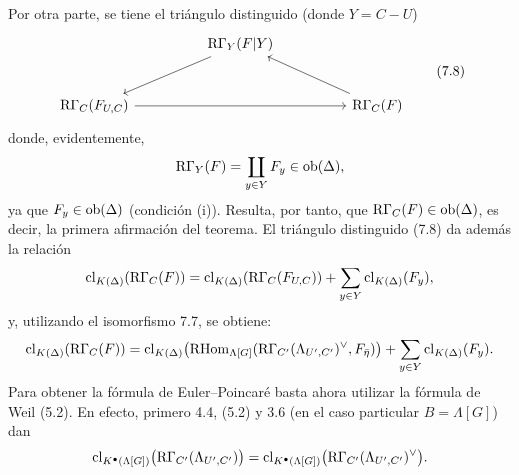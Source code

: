 Por otra parte, se tiene el triángulo distinguido (donde $Y=C-U$)
\[
\begin{tikzcd}[column sep=huge,row sep=large]
& \RG_Y(F|Y) \arrow[dl] & \\
\RG_C(F_{U,C}) \arrow[rr] && \RG_C(F) \arrow[ul]
\end{tikzcd}
\tag{7.8}
\]
donde, evidentemente,
\[
\mathrm R\Gamma_Y(F)=\coprod_{y\in Y}F_y\in\operatorname{ob}(\Delta),
\]
ya que $F_y\in\operatorname{ob}(\Delta)$ (condición (i)). Resulta, por tanto, que $\mathrm R\Gamma_C(F)\in\operatorname{ob}(\Delta)$, es decir, la primera afirmación del teorema. El triángulo distinguido (7.8) da además la relación
\[
\operatorname{cl}_{K(\Delta)}(\mathrm R\Gamma_C(F))
=
\operatorname{cl}_{K(\Delta)}(\mathrm R\Gamma_C(F_{U,C}))
+\sum_{y\in Y}\operatorname{cl}_{K(\Delta)}(F_y),
\]
y, utilizando el isomorfismo 7.7, se obtiene:
\[
\operatorname{cl}_{K(\Delta)}(\mathrm R\Gamma_C(F))
=
\operatorname{cl}_{K(\Delta)}\bigl(\mathrm{RHom}_{\Lambda[G]}(\mathrm R\Gamma_{C'}(\Lambda_{U',C'})^\vee,F_{\bar\eta})\bigr)
+\sum_{y\in Y}\operatorname{cl}_{K(\Delta)}(F_y).
\]
Para obtener la fórmula de Euler--Poincaré basta ahora utilizar la fórmula de Weil (5.2). En efecto, primero 4.4, (5.2) y 3.6 (en el caso particular $B=\Lambda[G]$) dan
\[
\operatorname{cl}_{K^{\bullet}(\Lambda[G])}\bigl(\mathrm R\Gamma_{C'}(\Lambda_{U',C'})\bigr)
=
\operatorname{cl}_{K^{\bullet}(\Lambda[G])}\bigl(\mathrm R\Gamma_{C'}(\Lambda_{U',C'})^\vee\bigr).
\]
